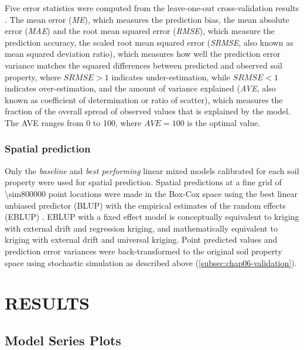 Five error statistics were computed from the leave-one-out cross-validation results \cite{JanssenEtAl1995, 
KempenEtAl2010, BrusEtAl2011}. The mean error (\textit{ME}), which measures the prediction bias, the mean 
absolute error (\textit{MAE}) and the root mean squared error (\textit{RMSE}), which measure the prediction 
accuracy, the scaled root mean squared error (\textit{SRMSE}, also known as mean squared deviation ratio), 
which measures how well the prediction error variance matches the squared differences between predicted and 
observed soil property, where $\textit{SRMSE} > 1$ indicates under-estimation, while $\textit{SRMSE} < 1$ 
indicates over-estimation, and the amount of variance explained (\textit{AVE}, also known as coefficient of 
determination or ratio of scatter), which measures the fraction of the overall spread of observed values that 
is explained by the model. The AVE ranges from \num{0} to \num{100}, where $\textit{AVE} = 100$ is the optimal 
value.

\subsubsection{Spatial prediction}
\label{subsec:chap06-prediction}

Only the \emph{baseline} and \emph{best performing} linear mixed models calibrated for each soil property were 
used for spatial prediction. Spatial predictions at a fine grid of \num{\sim800000} point locations were made 
in the Box-Cox space using the best linear unbiased predictor (BLUP) with the empirical estimates of the 
random effects (EBLUP) \cite{LarkEtAl2006}. EBLUP with a fixed effect model is conceptually equivalent to 
kriging with external drift and regression kriging, and mathematically equivalent to kriging with external 
drift and universal kriging. Point predicted values and prediction error variances were back-transformed to 
the original soil property space using stochastic simulation as described above 
(\autoref{subsec:chap06-validation}).

\section{RESULTS}
\label{sec:chap06-results}

\subsection{Model Series Plots}

